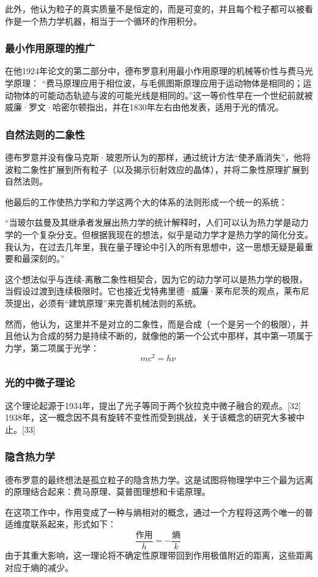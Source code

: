 此外，他认为粒子的真实质量不是恒定的，而是可变的，并且每个粒子都可以被看作是一个热力学机器，相当于一个循环的作用积分。
\subsubsection{最小作用原理的推广}  
在他1924年论文的第二部分中，德布罗意利用最小作用原理的机械等价性与费马光学原理： “费马原理应用于相位波，与毛佩图斯原理应用于运动物体是相同的；运动物体的可能动态轨迹与波的可能光线是相同的。”这一等价性早在一个世纪前就被威廉·罗文·哈密尔顿指出，并在1830年左右由他发表，适用于光的情况。
\subsubsection{自然法则的二象性}  
德布罗意并没有像马克斯·玻恩所认为的那样，通过统计方法“使矛盾消失”，他将波粒二象性扩展到所有粒子（以及揭示衍射效应的晶体），并将二象性原理扩展到自然法则。

他最后的工作使热力学和力学这两个大的体系的法则形成一个统一的系统：

“当玻尔兹曼及其继承者发展出热力学的统计解释时，人们可以认为热力学是动力学的一个复杂分支。但根据我现在的想法，似乎是动力学才是热力学的简化分支。我认为，在过去几年里，我在量子理论中引入的所有思想中，这一思想无疑是最重要和最深刻的。”

这个想法似乎与连续-离散二象性相契合，因为它的动力学可以是热力学的极限，当假设过渡到连续极限时。它也接近戈特弗里德·威廉·莱布尼茨的观点，莱布尼茨提出，必须有“建筑原理”来完善机械法则的系统。

然而，他认为，这里并不是对立的二象性，而是合成（一个是另一个的极限），并且他认为合成的努力是持续不断的，就像他的第一个公式中那样，其中第一项属于力学，第二项属于光学：
\[ mc^{2} = h\nu ~\]
\subsubsection{光的中微子理论}   
这个理论起源于1934年，提出了光子等同于两个狄拉克中微子融合的观点。[32] 1938年，这一概念因不具有旋转不变性而受到挑战，关于该概念的研究大多被中止。[33]
\subsubsection{隐含热力学}  
德布罗意的最终想法是孤立粒子的隐含热力学。这是试图将物理学中三个最为远离的原理结合起来：费马原理、莫普图理想和卡诺原理。

在这项工作中，作用变成了一种与熵相对的概念，通过一个方程将这两个唯一的普适维度联系起来，形式如下：
\[
\frac{\text{作用}}{h} = -\frac{\text{熵}}{k}~
\]
由于其重大影响，这一理论将不确定性原理带回到作用极值附近的距离，这些距离对应于熵的减少。
